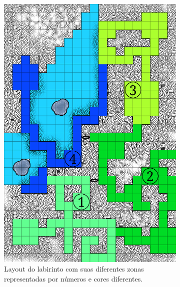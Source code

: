 \documentclass[
	12pt,				%
	openright,			%
	twoside,			%
	a4paper,			%
	english,			%
	french,				%
	spanish,			%
	brazil				%
	]{abntex2}
\begin{document}
\begin{figure}[h!]
  \centering
  \begin{subfigure}[b]{0.45\linewidth}
    \includegraphics[width=\linewidth]{encounterZones.png}
     \caption{Layout do labirinto com suas diferentes zonas representadas por números e cores diferentes.}
  \end{subfigure}
  \begin{subfigure}[b]{0.45\linewidth}

\end{subfigure}
\end{figure}
\end{document}
